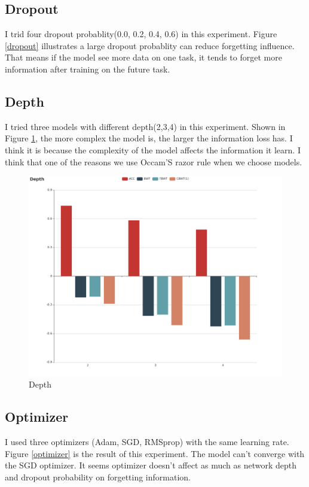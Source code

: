 \documentclass{article}
\begin{document}
\subsection{Dropout}
I trid four dropout probablity(0.0, 0.2, 0.4, 0.6) in this experiment. Figure \ref{dropout} illustrates a large dropout probablity can reduce forgetting influence. That means if the model see more data on one task, it tends to forget more information after training on the future task.


\subsection{Depth}
I tried three models with different depth(2,3,4) in this experiment. Shown in Figure \ref{depth}, the more complex the model is, the larger the information loss has. I think it is because the complexity of the model affects the information it learn. I think that one of the reasons we use Occam'S razor rule when we choose models. 

\begin{figure}[htbp]
\centering
\includegraphics[scale=0.3]{img/Depth.png}
\caption{Depth}
\label{depth}
\end{figure}

\subsection{Optimizer}
I used three optimizers (Adam, SGD, RMSprop) with the same learning rate. Figure \ref{optimizer} is the result of this experiment. The model can't converge with the SGD optimizer. It seems optimizer doesn't affect as much as network depth and dropout probability on forgetting information.
\end{document}
